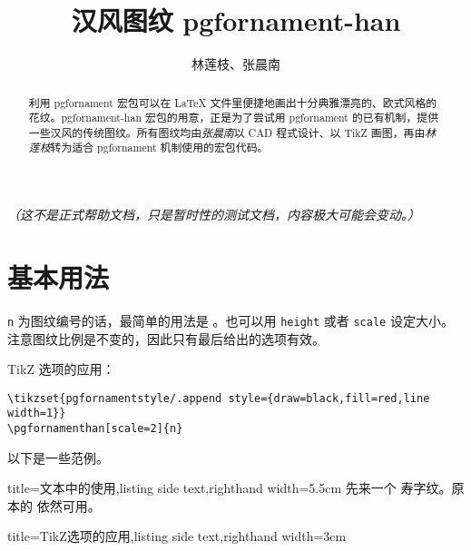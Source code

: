 \documentclass{ctexart}
\title{汉风图纹 pgfornament-han}
\author{林莲枝、张晨南}
\begin{document}
\maketitle

\begin{abstract}
利用 pgfornament 宏包可以在 \LaTeX{} 文件里便捷地画出十分典雅漂亮的、欧式风格的花纹。pgfornament-han 宏包的用意，正是为了尝试用 pgfornament 的已有机制，提供一些汉风的传统图纹。所有图纹均由\emph{张晨南}以 CAD 程式设计、以 TikZ 画图，再由\emph{林莲枝}转为适合 pgfornament 机制使用的宏包代码。
\end{abstract}

\emph{（这不是正式帮助文档，只是暂时性的测试文档，内容极大可能会变动。）}

\section{基本用法}

\texttt{n} 为图纹编号的话，最简单的用法是 \texttt{}。也可以用 \texttt{height} 或者 \texttt{scale} 设定大小。注意图纹比例是不变的，因此只有最后给出的选项有效。

TikZ 选项的应用：
\begin{verbatim}
\tikzset{pgfornamentstyle/.append style={draw=black,fill=red,line width=1}}
\pgfornamenthan[scale=2]{n}
\end{verbatim}

以下是一些范例。

\bigskip

\begin{tcblisting}{title={文本中的使用},listing side text,righthand width=5.5cm}
先来一个 
寿字纹。原本的  依然可用。
\end{tcblisting}

\begin{tcblisting}{title={TikZ选项的应用},listing side text,righthand width=3cm}
\end{tcblisting}
\end{document}
